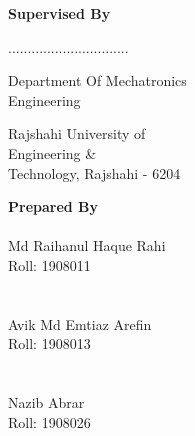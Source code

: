 \begin{center}
\begin{multicols}{2}
    \noindent \textbf{Supervised By}


    \noindent ...............................

    \noindent Department Of Mechatronics\\    
    Engineering

    \noindent Rajshahi University of\\
    Engineering \&\\
    Technology, Rajshahi - 6204

    \columnbreak
    
    \noindent \textbf{Prepared By}
    \noindent \makebox[6cm]{}\\
    \noindent \makebox[6cm]{\dotfill}\\

    Md Raihanul Haque Rahi\\
    Roll: 1908011\\

    \noindent \makebox[6cm]{}\\
    \noindent \makebox[6cm]{\dotfill}\\

    Avik Md Emtiaz Arefin\\
    Roll: 1908013\\

    \noindent \makebox[6cm]{}\\
    \noindent \makebox[6cm]{\dotfill}\\
    Nazib Abrar\\
    Roll: 1908026\\

\end{multicols}
\end{center}